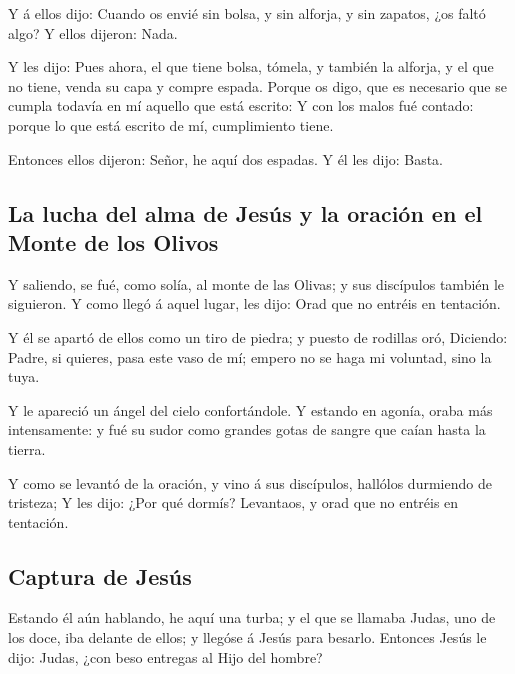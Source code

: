  Y á ellos dijo: Cuando os envié sin bolsa, y sin
alforja, y sin zapatos, ¿os faltó algo? Y ellos dijeron: Nada.

 Y les dijo: Pues ahora, el que tiene bolsa, tómela, y
también la alforja, y el que no tiene, venda su capa y compre espada.
 Porque os digo, que es necesario que se cumpla todavía
en mí aquello que está escrito: Y con los malos fué contado: porque lo
que está escrito de mí, cumplimiento tiene.

 Entonces ellos dijeron: Señor, he aquí dos espadas. Y él
les dijo: Basta.

\hypertarget{la-lucha-del-alma-de-jesuxfas-y-la-oraciuxf3n-en-el-monte-de-los-olivos}{%
\subsection{La lucha del alma de Jesús y la oración en el Monte de los
Olivos}\label{la-lucha-del-alma-de-jesuxfas-y-la-oraciuxf3n-en-el-monte-de-los-olivos}}

 Y saliendo, se fué, como solía, al monte de las Olivas;
y sus discípulos también le siguieron.  Y como llegó á
aquel lugar, les dijo: Orad que no entréis en tentación.

 Y él se apartó de ellos como un tiro de piedra; y puesto
de rodillas oró,  Diciendo: Padre, si quieres, pasa este
vaso de mí; empero no se haga mi voluntad, sino la tuya.

 Y le apareció un ángel del cielo confortándole.
 Y estando en agonía, oraba más intensamente: y fué su
sudor como grandes gotas de sangre que caían hasta la tierra.

 Y como se levantó de la oración, y vino á sus
discípulos, hallólos durmiendo de tristeza;  Y les dijo:
¿Por qué dormís? Levantaos, y orad que no entréis en tentación.

\hypertarget{captura-de-jesuxfas}{%
\subsection{Captura de Jesús}\label{captura-de-jesuxfas}}

 Estando él aún hablando, he aquí una turba; y el que se
llamaba Judas, uno de los doce, iba delante de ellos; y llegóse á Jesús
para besarlo.  Entonces Jesús le dijo: Judas, ¿con beso
entregas al Hijo del hombre?

